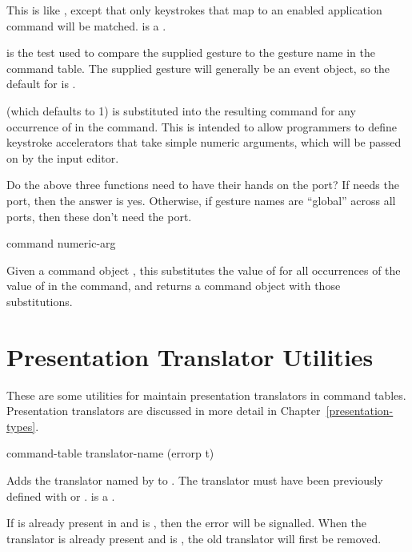 This is like , except that only keystrokes that map to
an enabled application command will be matched.   is a
.

 is the test used to compare the supplied gesture to the gesture name
in the command table.  The supplied gesture will generally be an event object,
so the default for  is .

 (which defaults to 1) is substituted into the resulting
command for any occurrence of  in the command.
This is intended to allow programmers to define keystroke accelerators that take
simple numeric arguments, which will be passed on by the input editor.

 {Do the above three functions need to have their hands on the port?
If  needs the port, then the answer is yes.
Otherwise, if gesture names are ``global'' across all ports, then these don't
need the port.}

 {command numeric-arg}

Given a command object , this substitutes the value of
 for all occurrences of the value of
 in the command, and returns a command object
with those substitutions.


\section {Presentation Translator Utilities}

These are some utilities for maintain presentation translators in
command tables.  Presentation translators are discussed in more detail
in Chapter~\ref{presentation-types}.


 {command-table translator-name
                                                       \key (errorp t)}

Adds the translator named by  to .  The
translator must have been previously defined with 
or .   is a
.

If  is already present in  and
 is , then the  error will be
signalled.  When the translator is already present and  is
, the old translator will first be removed.


